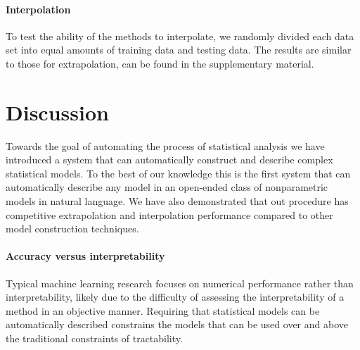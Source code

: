 \documentclass[letterpaper]{article}
\begin{document}
\paragraph{Interpolation}
To test the ability of the methods to interpolate, we randomly divided each data set into equal amounts of training data and testing data.
The results are similar to those for extrapolation, can be found in the supplementary material.


\section{Discussion}

Towards the goal of automating the process of statistical analysis we have introduced a system that can automatically construct and describe complex statistical models.
To the best of our knowledge this is the first system that can automatically describe any model in an open-ended class of nonparametric models in natural language.
We have also demonstrated that out procedure has competitive extrapolation and interpolation performance compared to other model construction techniques.


\paragraph{Accuracy versus interpretability}

Typical machine learning research focuses on numerical performance rather than interpretability, likely due to the difficulty of assessing the interpretability of a method in an objective manner.
Requiring that statistical models can be automatically described constrains the models that can be used over and above the traditional constraints of tractability.

\end{document}
